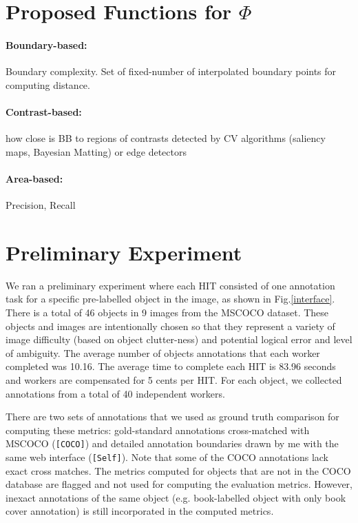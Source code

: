 \documentclass[12pt]{article}
\begin{document}
\section{Proposed Functions for $\Phi$}
\paragraph{Boundary-based:} Boundary complexity. Set of fixed-number of interpolated boundary points for computing distance.\cite{Vittayakorn2011}
\paragraph{Contrast-based:} how close is BB to regions of contrasts detected by CV algorithms (saliency maps, Bayesian Matting) or edge detectors 
\paragraph{Area-based:} Precision, Recall
\section{Preliminary Experiment}
We ran a preliminary experiment where each HIT consisted of one annotation task for a specific pre-labelled object in the image, as shown in Fig.\ref{interface}. There is a total of 46 objects in 9 images from the MSCOCO dataset\cite{Lin2014}. These objects and images are intentionally chosen so that they represent a variety of image difficulty (based on object clutter-ness) and potential logical error and level of ambiguity. The average number of objects annotations that each worker completed was 10.16. The average time to complete each HIT is 83.96 seconds and workers are compensated for 5 cents per HIT.  For each object, we collected annotations from a total of 40 independent workers.
\par There are two sets of annotations that we used as ground truth comparison for computing these metrics: gold-standard annotations cross-matched with MSCOCO (\texttt{[COCO]}) and detailed annotation boundaries drawn by me with the same web interface (\texttt{[Self]}). Note that some of the COCO annotations lack exact cross matches. The metrics computed for objects that are not in the COCO database are flagged and not used for computing the evaluation metrics. However, inexact annotations of the same object (e.g. book-labelled object with only book cover annotation) is still incorporated in the computed metrics.
\end{document}
